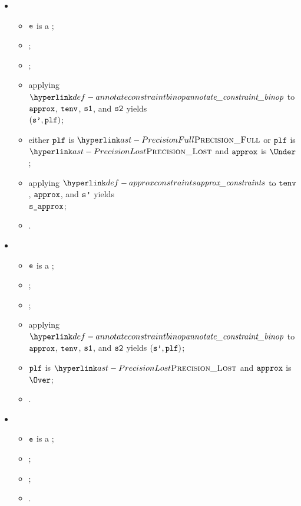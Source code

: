 \begin{itemize}
  \item {}
  \begin{itemize}
    \item $\texttt{e}$ is a \binopexpression{$\op$}{$\veone$}{$\vetwo$};
    \item \Proseapproxexpr{$\tenv$}{$\vapprox$}{$\veone$}{$\vsone$}\ProseTerminateAs{\CannotOverapproximate};
    \item \Proseapproxexpr{$\tenv$}{$\vapprox$}{$\vetwo$}{$\vstwo$}\ProseTerminateAs{\CannotOverapproximate};
    \item applying $\annotateconstraintbinop$ to $\vapprox$, $\tenv$, $\vsone$, and $\vstwo$ yields \\
          $(\texttt{s'}, \texttt{plf})$;
    \item either $\texttt{plf}$ is $\PrecisionFull$ or $\texttt{plf}$ is $\PrecisionLost$ and $\vapprox$ is $\Under$;
    \item applying $\approxconstraints$ to $\tenv$, $\vapprox$, and $\texttt{s'}$ yields \\
          $\vsapprox$\ProseTerminateAs{\CannotOverapproximate};
    \item \Proseeqdef{$\vs$}{$\vsapprox$}.
  \end{itemize}

  \item {}
  \begin{itemize}
    \item $\texttt{e}$ is a \binopexpression{$\op$}{$\veone$}{$\vetwo$};
    \item \Proseapproxexpr{$\tenv$}{$\vapprox$}{$\veone$}{$\vsone$}\ProseTerminateAs{\CannotOverapproximate};
    \item \Proseapproxexpr{$\tenv$}{$\vapprox$}{$\vetwo$}{$\vstwo$}\ProseTerminateAs{\CannotOverapproximate};
    \item applying $\annotateconstraintbinop$ to $\vapprox$, $\tenv$, $\vsone$, and $\vstwo$ yields $(\texttt{s'}, \texttt{plf})$;
    \item $\texttt{plf}$ is $\PrecisionLost$ and $\vapprox$ is $\Over$;
    \item \Proseeqdef{$\vs$}{$\CannotOverapproximate$}.
  \end{itemize}

  \item {}
  \begin{itemize}
    \item $\texttt{e}$ is a ;
    \item \Proseapproxexpr{$\tenv$}{$\vapprox$}{$\vetwo$}{$\vstwo$}\ProseTerminateAs{\CannotOverapproximate};
    \item \Proseapproxexpr{$\tenv$}{$\vapprox$}{$\vethree$}{$\vsthree$}\ProseTerminateAs{\CannotOverapproximate};
    \item {}.
  \end{itemize}


\end{itemize}
